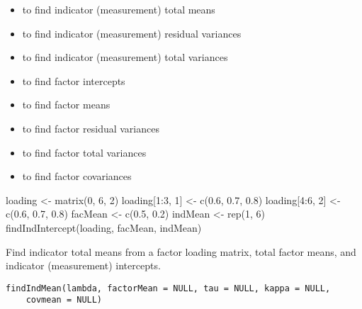 \documentclass[a4paper]{book}
\begin{document}
%
\begin{SeeAlso}\relax
\begin{itemize}

\item {} to find indicator (measurement) total means
\item {} to find indicator (measurement) residual variances
\item {} to find indicator (measurement) total variances
\item {} to find factor intercepts
\item {} to find factor means
\item {} to find factor residual variances
\item {} to find factor total variances
\item {} to find factor covariances

\end{itemize}

\end{SeeAlso}
%
\begin{Examples}
\begin{ExampleCode}
loading <- matrix(0, 6, 2)
loading[1:3, 1] <- c(0.6, 0.7, 0.8)
loading[4:6, 2] <- c(0.6, 0.7, 0.8)
facMean <- c(0.5, 0.2)
indMean <- rep(1, 6)
findIndIntercept(loading, facMean, indMean)
\end{ExampleCode}
\end{Examples}
%
\begin{Description}\relax
Find indicator total means from a factor loading matrix, total factor means, and indicator (measurement) intercepts.
\end{Description}
%
\begin{Usage}
\begin{verbatim}
findIndMean(lambda, factorMean = NULL, tau = NULL, kappa = NULL, 
	covmean = NULL)
\end{verbatim}
\end{Usage}
%
\end{document}
